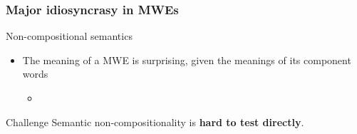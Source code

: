 \documentclass[xcolor=dvipsnames]{beamer}
\begin{document}

\begin{frame}
  \frametitle{Major idiosyncrasy in MWEs}


\begin{block}{Non-compositional semantics}
   \begin{itemize}
   \item The meaning of a MWE is surprising, given the meanings of its component words
      \begin{itemize}
      \item[] 
      \end{itemize}
   \end{itemize}
\end{block}

\pause

\begin{block}{Challenge}
Semantic non-compositionality is \textbf{hard to test directly}.
\end{block}


\end{frame}
\end{document}
